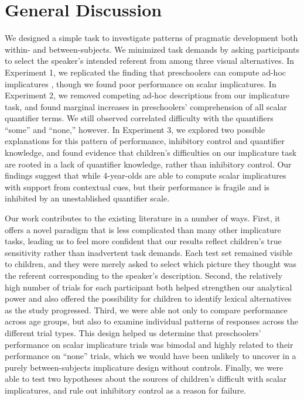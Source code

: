 \documentclass[man]{apa2}
\begin{document}
{\section{General Discussion}

We designed a simple task to investigate patterns of pragmatic development both within- and between-subjects. We minimized task demands by asking participants to select the speaker's intended referent from among three visual alternatives. In Experiment 1, we replicated the finding that preschoolers can compute ad-hoc implicatures \cite{stiller2014}, though we found poor performance on scalar implicatures. In Experiment 2, we removed competing ad-hoc descriptions from our implicature task, and found marginal increases in preschoolers' comprehension of all scalar quantifier terms. We still observed correlated difficulty with the quantifiers ``some'' and ``none,'' however. In Experiment 3, we explored two possible explanations for this pattern of performance, inhibitory control and quantifier knowledge, and found evidence that children's difficulties on our implicature task are rooted in a lack of quantifier knowledge, rather than inhibitory control. Our findings suggest that while 4-year-olds are able to compute scalar implicatures with support from contextual cues, but their performance is fragile and is inhibited by an unestablished quantifier scale.

Our work contributes to the existing literature in a number of ways. First, it offers a novel paradigm that is less complicated than many other implicature tasks, leading us to feel more confident that our results reflect children's true sensitivity rather than inadvertent task demands. Each test set remained visible to children, and they were merely asked to select which picture they thought was the referent corresponding to the speaker's description. Second, the relatively high number of trials for each participant both helped strengthen our analytical power and also offered the possibility for children to identify lexical alternatives as the study progressed. Third, we were able not only to compare performance across age groups, but also to examine individual patterns of responses across the different trial types. This design helped us determine that preschoolers' performance on scalar implicature trials was bimodal and highly related to their performance on ``none'' trials, which we would have been unlikely to uncover in a purely between-subjects implicature design without controls. Finally, we were able to test two hypotheses about the sources of children's difficult with scalar implicatures, and rule out inhibitory control as a reason for failure.

}
\end{document}

